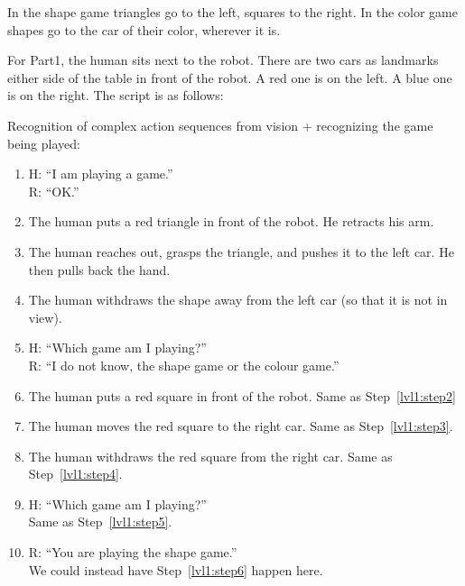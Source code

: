 \documentclass{article}
\begin{document}
In the shape game triangles go to the left, squares to the right.  In
the color game shapes go to the car of their color, wherever it is.

For Part1, the human sits next to the robot. There are two cars as
landmarks either side of the table in front of the robot. A red one is
on the left. A blue one is on the right. The script is as follows:

Recognition of complex action sequences from vision + recognizing the
game being played:
\begin{enumerate}
\item \label{lvl1:step1} 
  H: ``I am playing a game.''\\
  R: ``OK.''

\item \label{lvl1:step2} The human puts a red triangle in front of the
  robot. He retracts his arm.

\item \label{lvl1:step3} The human reaches out, grasps the triangle,
  and pushes it to the left car. He then pulls back the hand.

\item \label{lvl1:step4} The human withdraws the shape away from the
  left car (so that it is not in view).

\item \label{lvl1:step5}
  H: ``Which game am I playing?''\\
  R: ``I do not know, the shape game or the colour game.''

\item \label{lvl1:step6} The human puts a red square in front of the
  robot.  Same as Step~\ref{lvl1:step2}

\item \label{lv1:step7} The human moves the red square to the right
  car.  Same as Step~\ref{lvl1:step3}.

\item \label{lvl1:step8} The human withdraws the red square from the
  right car.  Same as Step~\ref{lvl1:step4}.

\item \label{lvl1:step9}
  H: ``Which game am I playing?''\\
  Same as Step~\ref{lvl1:step5}.

\item \label{lvl1:step10}
  R: ``You are playing the shape game.''\\
  We could instead have Step~\ref{lvl1:step6} happen here.


\end{enumerate}
\end{document}
